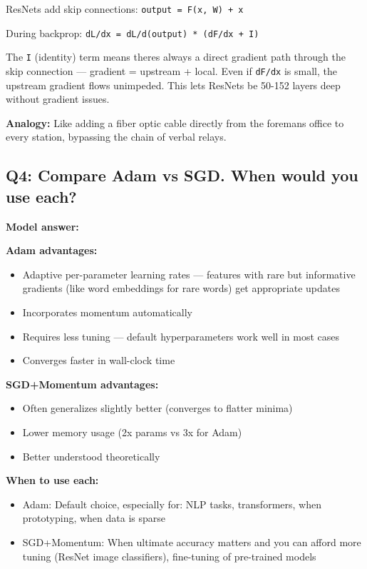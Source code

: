 \documentclass[11pt]{article}
\providecommand{\tightlist}{\setlength{\itemsep}{1pt}\setlength{\parskip}{0pt}}
\begin{document}
ResNets add skip connections: \texttt{output\ =\ F(x,\ W)\ +\ x}

During backprop: \texttt{dL/dx\ =\ dL/d(output)\ *\ (dF/dx\ +\ I)}

The \texttt{I} (identity) term means there\textquotesingle s always a direct gradient path through the skip connection --- gradient = upstream + local. Even if \texttt{dF/dx} is small, the upstream gradient flows unimpeded. This lets ResNets be 50-152 layers deep without gradient issues.

\textbf{Analogy:} Like adding a fiber optic cable directly from the foreman\textquotesingle s office to every station, bypassing the chain of verbal relays.

\subsection{Q4: Compare Adam vs SGD. When would you use each?}\label{q4-compare-adam-vs-sgd-when-would-you-use-each}

\textbf{Model answer:}

\textbf{Adam advantages:}

\begin{itemize}
\tightlist
\item
  Adaptive per-parameter learning rates --- features with rare but informative gradients (like word embeddings for rare words) get appropriate updates
\item
  Incorporates momentum automatically
\item
  Requires less tuning --- default hyperparameters work well in most cases
\item
  Converges faster in wall-clock time
\end{itemize}

\textbf{SGD+Momentum advantages:}

\begin{itemize}
\tightlist
\item
  Often generalizes slightly better (converges to flatter minima)
\item
  Lower memory usage (2x params vs 3x for Adam)
\item
  Better understood theoretically
\end{itemize}

\textbf{When to use each:}

\begin{itemize}
\tightlist
\item
  Adam: Default choice, especially for: NLP tasks, transformers, when prototyping, when data is sparse
\item
  SGD+Momentum: When ultimate accuracy matters and you can afford more tuning (ResNet image classifiers), fine-tuning of pre-trained models
\end{itemize}
\end{document}
